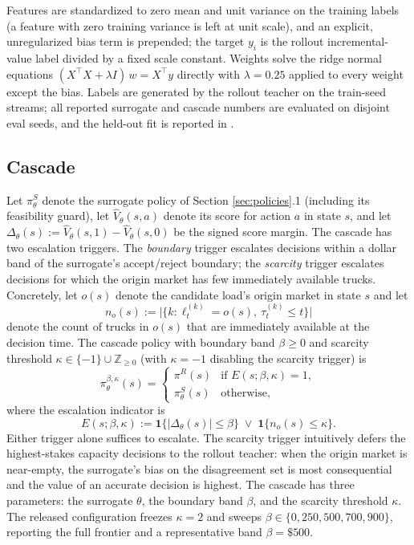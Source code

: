 \documentclass[11pt]{article}
\begin{document}
Features are standardized to zero mean and unit variance on the training
labels (a feature with zero training variance is left at unit scale), and
an explicit, unregularized bias term is prepended; the target $y_i$ is the
rollout incremental-value label divided by a fixed scale constant. Weights
solve the ridge normal equations $(X^\top X + \lambda I)\,w = X^\top y$
directly with $\lambda = 0.25$ applied to every weight except the bias.
Labels are generated by the rollout teacher on the train-seed streams; all
reported surrogate and cascade numbers are evaluated on disjoint eval
seeds, and the held-out fit is reported in
.

\subsection{Cascade}

Let $\pi^{S}_\theta$ denote the surrogate policy of Section
\ref{sec:policies}.1 (including its feasibility guard), let
$\hat{V}_\theta(s, a)$ denote its score for action $a$ in state $s$, and
let $\Delta_\theta(s) := \hat{V}_\theta(s, 1) - \hat{V}_\theta(s, 0)$ be
the signed score margin. The cascade has two escalation triggers. The
\emph{boundary} trigger escalates decisions within a dollar band of the
surrogate's accept/reject boundary; the \emph{scarcity} trigger
escalates decisions for which the origin market has few immediately
available trucks. Concretely, let $o(s)$ denote the candidate load's
origin market in state $s$ and let
\begin{equation}
  n_o(s) := \bigl|\bigl\{ k :
  \ell^{(k)}_t = o(s),\ \tau^{(k)}_t \leq t \bigr\}\bigr|
\end{equation}
denote the count of trucks in $o(s)$ that are immediately available at
the decision time. The cascade policy with boundary band $\beta \geq 0$
and scarcity threshold $\kappa \in \{-1\} \cup \mathbb{Z}_{\geq 0}$ (with
$\kappa = -1$ disabling the scarcity trigger) is
\begin{equation}
  \pi^{\beta, \kappa}_\theta(s) =
  \begin{cases}
    \pi^{R}(s)        & \text{if } E(s; \beta, \kappa) = 1, \\
    \pi^{S}_\theta(s) & \text{otherwise,}
  \end{cases}
\end{equation}
where the escalation indicator is
\begin{equation}
  E(s; \beta, \kappa) := \mathbf{1}\bigl\{|\Delta_\theta(s)| \leq \beta\bigr\}
  \;\lor\; \mathbf{1}\bigl\{n_o(s) \leq \kappa\bigr\}.
  \label{eq:cascade-escalation}
\end{equation}
Either trigger alone suffices to escalate. The scarcity trigger
intuitively defers the highest-stakes capacity decisions to the rollout
teacher: when the origin market is near-empty, the surrogate's bias on
the disagreement set is most consequential and the value of an accurate
decision is highest. The cascade has three parameters: the surrogate
$\theta$, the boundary band $\beta$, and the scarcity threshold
$\kappa$. The released configuration freezes $\kappa = 2$ and sweeps
$\beta \in \{0, 250, 500, 700, 900\}$, reporting the full frontier and a
representative band $\beta = \$500$.
\end{document}
